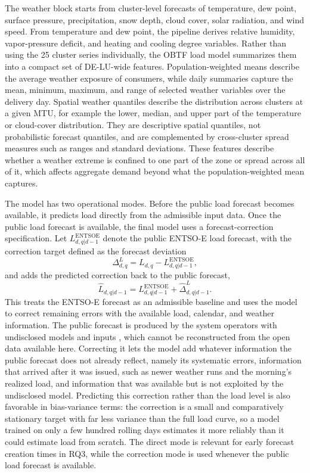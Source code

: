 The weather block starts from cluster-level forecasts of temperature, dew
point, surface pressure, precipitation, snow depth, cloud cover, solar
radiation, and wind speed. From temperature and dew point, the pipeline derives
relative humidity, vapor-pressure deficit, and heating and cooling degree
variables. Rather than using the 25 cluster series individually, the OBTF load model summarizes
them into a compact set of \mbox{DE-LU}-wide features.
Population-weighted means describe the average weather exposure of consumers,
while daily summaries capture the mean, minimum, maximum, and range of selected
weather variables over the delivery day. Spatial weather quantiles describe the
distribution across clusters at a given MTU, for example the lower, median, and
upper part of the temperature or cloud-cover distribution. They are
descriptive spatial quantiles, not probabilistic forecast quantiles, and are
complemented by cross-cluster spread measures such as ranges and standard
deviations. These features describe whether a weather extreme is confined to one part of the
zone or spread across all of it, which affects aggregate demand beyond what the
population-weighted mean captures.

The model has two operational modes. Before the public load forecast becomes
available, it predicts load directly from the admissible input data. Once the
public load forecast is available, the final model uses a forecast-correction
specification. Let \(L^{\mathrm{ENTSOE}}_{d,q|d-1}\) denote the public
\mbox{ENTSO-E} load forecast, with the correction target defined as the
forecast deviation
\[
  \Delta^{L}_{d,q}
  =
  L_{d,q} - L^{\mathrm{ENTSOE}}_{d,q|d-1},
\]
and adds the predicted correction back to the public forecast,
\[
  \hat{L}_{d,q|d-1}
  =
  L^{\mathrm{ENTSOE}}_{d,q|d-1} + \hat{\Delta}^{L}_{d,q|d-1}.
\]
This treats the \mbox{ENTSO-E} forecast as an admissible baseline and uses the
model to correct remaining errors with the available load, calendar, and
weather information. The public forecast is produced by the system operators
with undisclosed models and inputs \cite{euRegulation543_2013,entsoeTransparency},
which cannot be reconstructed from the open data available here. Correcting it
lets the model add whatever information the public forecast does not already
reflect, namely its systematic errors, information that arrived after it was
issued, such as newer weather runs and the morning's realized load, and
information that was available but is not exploited by the undisclosed model. Predicting this correction rather than the
load level is also favorable in bias-variance terms: the correction is a small
and comparatively stationary target with far less variance than the full load
curve, so a model trained on only a few hundred rolling days estimates it more
reliably than it could estimate load from scratch. The direct mode is relevant for early forecast
creation times in RQ3, while the correction mode is used whenever the public
load forecast is available.

